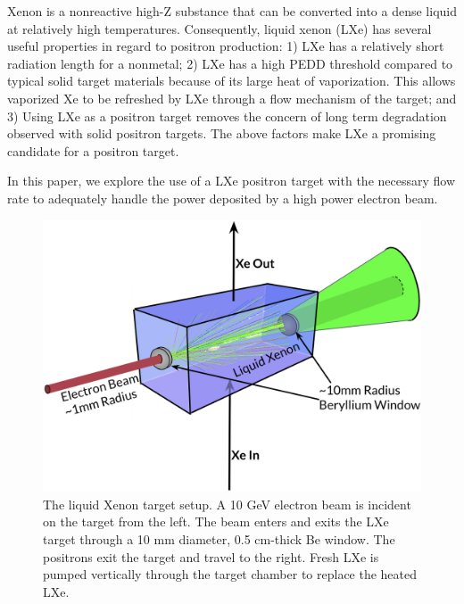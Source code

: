 \documentclass[
reprint,
nofootinbib,
amsmath, amssymb,
aps,
floatfix,
]{revtex4-2}
\begin{document}
Xenon is a nonreactive high-Z substance that can be converted into a dense liquid at relatively
high temperatures.  
Consequently, liquid xenon (LXe) has several useful properties in regard to positron production: 1) LXe has a relatively short radiation length for a nonmetal; 2) 
LXe has a high PEDD threshold compared to typical solid target materials because of its large heat of vaporization.  This allows vaporized Xe to be refreshed by LXe through a flow mechanism of the target; and 3) Using LXe as a positron target removes the concern of long term degradation observed with solid positron targets.  
The above factors make LXe a promising candidate for a positron target.

In this paper, we explore the use of a LXe positron target with the necessary flow rate to adequately handle the power deposited by a high power electron beam.


\begin{figure}[H]
    \includegraphics[width = \linewidth]{../images/Schematic4.png}
    \caption{\label{fig:schem}The liquid Xenon target setup. A 10 GeV electron beam is incident on the target from the left. The beam enters and exits the LXe target through a 10 mm diameter, 0.5 cm-thick Be window. The positrons exit the target and travel to the right.
    Fresh LXe is pumped vertically through the target chamber to replace the heated LXe.}
\end{figure}
\end{document}
